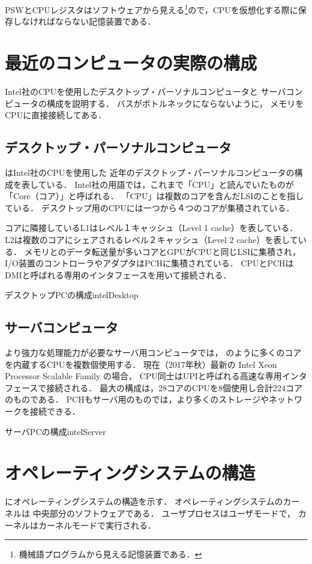 PSWとCPUレジスタはソフトウェアから見える\footnote{
機械語プログラムから見える記憶装置である．
}ので，CPUを仮想化する際に保存しなければならない記憶装置である．

\section{最近のコンピュータの実際の構成}

Intel社のCPUを使用したデスクトップ・パーソナルコンピュータと
サーバコンピュータの構成を説明する．
バスがボトルネックにならないように，
メモリをCPUに直接接続してある．

\subsection{デスクトップ・パーソナルコンピュータ}
はIntel社のCPUを使用した
近年のデスクトップ・パーソナルコンピュータの構成を表している．
Intel社の用語では，これまで「CPU」と読んでいたものが
「Core（コア）」と呼ばれる．
「CPU」は複数のコアを含んだLSIのことを指している．
デスクトップ用のCPUには一つから４つのコアが集積されている．

コアに隣接しているL1はレベル１キャッシュ（Level 1 cache）を表している．
L2は複数のコアにシェアされるレベル２キャッシュ（Level 2 cache）を表している．
メモリとのデータ転送量が多いコアとGPUがCPUと同じLSIに集積され，
I/O装置のコントローラやアダプタはPCHに集積されている．
CPUとPCHはDMIと呼ばれる専用のインタフェースを用いて接続される．

{デスクトップPCの構成}{intelDesktop}

\subsection{サーバコンピュータ}
より強力な処理能力が必要なサーバ用コンピュータでは，
のように多くのコアを内蔵するCPUを複数個使用する．
現在（2017年秋）最新の Intel Xeon Processor Scalable Family の場合，
CPU同士はUPIと呼ばれる高速な専用インタフェースで接続される．
最大の構成は，28コアのCPUを8個使用し合計224コアのものである．
PCHもサーバ用のものでは，より多くのストレージやネットワークを接続できる．

{サーバPCの構成}{intelServer}

\section{オペレーティングシステムの構造}
にオペレーティングシステムの構造を示す．
オペレーティングシステムのカーネルは
中央部分のソフトウェアである．
ユーザプロセスはユーザモードで，
カーネルはカーネルモードで実行される．

